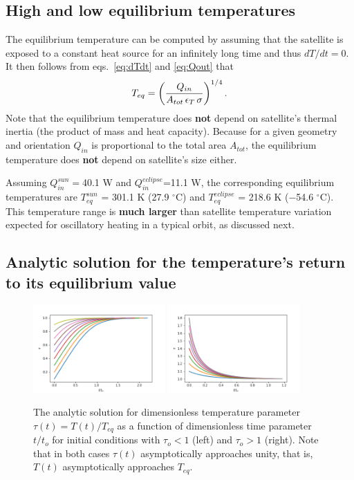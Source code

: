 \documentclass[]{aastex62}
\def\eq#1{\begin{equation} #1 \end{equation}}
\begin{document}
\subsection{High and low equilibrium temperatures} 

The equilibrium temperature can be computed by assuming that the satellite is exposed to a constant 
heat source for an infinitely long time and thus $dT/dt=0$. It then follows from eqs.~\ref{eq:dTdt} and 
\ref{eq:Qout} that
\eq{
\label{eq:Teq}
     T_{eq} = \left(  {Q_{in} \over A_{tot} \, \epsilon_T \, \sigma} \right)^{1/4}. 
}
Note that the equilibrium temperature does {\bf not} depend on satellite's thermal inertia (the product of 
mass and heat capacity).  Because for a given geometry and orientation $Q_{in}$ is proportional to the
total area $A_{tot}$, the equilibrium temperature does {\bf not} depend on satellite's size either. 

Assuming $Q_{in}^{sun}=$40.1 W and $Q_{in}^{eclipse}$=11.1 W, the corresponding equilibrium temperatures
are $T_{eq}^{sun}$ = 301.1 K  (27.9 $^\circ$C) and $T_{eq}^{eclipse}$ = 218.6 K  ($-$54.6 $^\circ$C).
This temperature range is {\bf much larger} than satellite temperature variation expected for oscillatory 
heating in a typical orbit, as discussed next. 


\subsection{Analytic solution for the temperature's return to its equilibrium value} 

 
\begin{figure}[t]
\centering
\includegraphics[width=0.45\textwidth, keepaspectratio]{figures/analyticUp.png}
\includegraphics[width=0.45\textwidth, keepaspectratio]{figures/analyticDown.png}
\caption{The analytic solution for dimensionless temperature parameter $\tau(t) = T(t)/T_{eq}$
as a function of  dimensionless time parameter $t/t_o$ for initial conditions with $\tau_o<1$
(left) and $\tau_o>1$ (right). Note that in both cases $\tau(t)$ asymptotically approaches unity,
that is, $T(t)$ asymptotically approaches $T_{eq}$. 
\label{fig:analytic}}
\end{figure}
\end{document}
